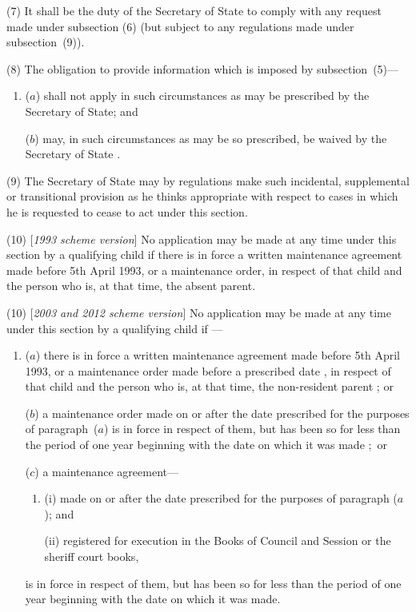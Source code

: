 \documentclass[12pt,a4paper]{article}
\begin{document}
(7) It shall be the duty of the 
Secretary of State  %
to comply with any request made under subsection (6)  (but subject to any regulations made under subsection~(9)).

(8) The obligation to provide information which is imposed by subsection~(5)—
\begin{enumerate}\item[]
($a$) shall not apply in such circumstances as may be prescribed by the Secretary of State; and

($b$) may, in such circumstances as may be so prescribed, be waived by the 
Secretary of State%
.
\end{enumerate}

(9) The Secretary of State may by regulations make such incidental, supplemental or transitional provision as he thinks appropriate with respect to cases in which he is requested to cease to act under this section.

(10) [\emph{1993 scheme version}] No application may be made at any time under this section by a qualifying child if there is in force a written maintenance agreement made before 5th April 1993, or a maintenance order, in respect of that child and the person who is, at that time, the absent parent.

(10) [\emph{2003 and 2012 scheme version}] No application may be made at any time under this section by a qualifying child if%
---
\begin{enumerate}\item[]
($a$) %
 there is in force a written maintenance agreement made before 5th April 1993, or a maintenance order
made before a prescribed date%
, in respect of that child and the person who is, at that time, the 
non-resident parent%
; or

($b$) a maintenance order made on or after the date prescribed for the purposes of paragraph~($a$)  is in force in respect of them, but has been so for less than the period of one year beginning with the date on which it was made%
;~or 

($c$) a maintenance agreement—
\begin{enumerate}\item[]
(i) made on or after the date prescribed for the purposes of paragraph ($a$); and

(ii) registered for execution in the Books of Council and Session or the sheriff court books,
\end{enumerate}
is in force in respect of them, but has been so for less than the period of one year beginning with the date on which it was made.
\end{enumerate}
\end{document}
